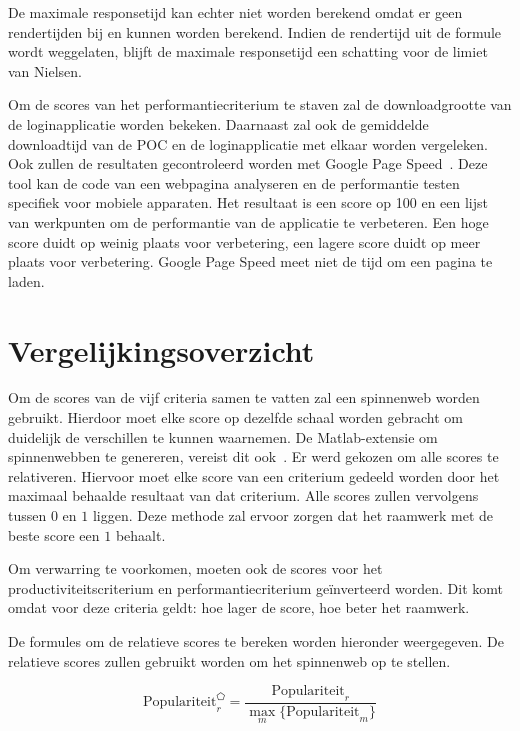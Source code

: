 De maximale responsetijd kan echter niet worden berekend omdat er geen rendertijden bij \st{} en \lungo{} kunnen worden berekend.
Indien de rendertijd uit de formule wordt weggelaten,  blijft de maximale responsetijd een schatting voor de limiet van Nielsen.

Om de scores van het performantiecriterium te staven zal de downloadgrootte van de loginapplicatie worden bekeken.
Daarnaast zal ook de gemiddelde downloadtijd van de POC en de loginapplicatie met elkaar worden vergeleken.
Ook zullen de resultaten gecontroleerd worden met Google Page Speed~\cite{Morgan2011}. 
Deze tool kan de code van een webpagina analyseren en de performantie testen specifiek voor mobiele apparaten.
Het resultaat is een score op 100 en een lijst van werkpunten om de performantie van de applicatie te verbeteren.
Een hoge score duidt op weinig plaats voor verbetering,  een lagere score duidt op meer plaats voor verbetering.
Google Page Speed meet niet de tijd om een pagina te laden.


\section{Vergelijkingsoverzicht}
\label{sec:vergelijking-spinnenweb}

Om de scores van de vijf criteria samen te vatten zal een spinnenweb worden gebruikt.
Hierdoor moet elke score op dezelfde schaal worden gebracht om duidelijk de verschillen te kunnen waarnemen.
De Matlab-extensie om spinnenwebben te genereren, vereist dit ook~\cite{Martti2007}.
Er werd gekozen om alle scores te relativeren.
Hiervoor moet elke score van een criterium gedeeld worden door het maximaal behaalde resultaat van dat criterium.
Alle scores zullen vervolgens tussen $0$ en $1$ liggen.
Deze methode zal ervoor zorgen dat het raamwerk met de beste score een $1$ behaalt.

Om verwarring te voorkomen, moeten ook de scores voor het productiviteitscriterium en performantiecriterium geïnverteerd worden.
Dit komt omdat voor deze criteria geldt:  hoe lager de score,  hoe beter het raamwerk.

De formules om de relatieve scores te bereken worden hieronder weergegeven.
De relatieve scores zullen gebruikt worden om het spinnenweb op te stellen.

\begin{equation}
  \text{Populariteit}_r^{\pentagon}=\frac{\text{Populariteit}_r}{\underset{m}{\max}\{\text{Populariteit}_m\}}
  \label{eq:rel-populariteit}
\end{equation}


